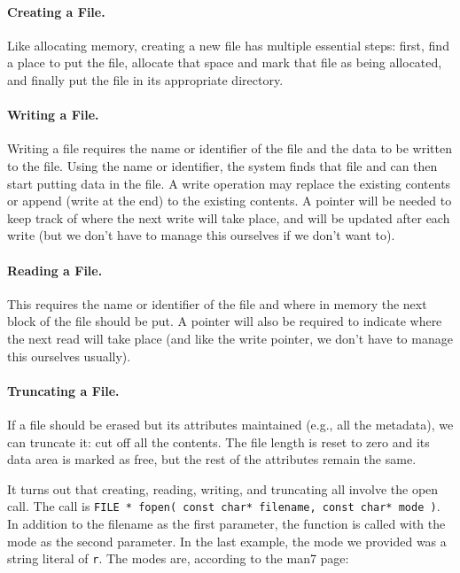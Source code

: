 \paragraph{Creating a File.} Like allocating memory, creating a new file has multiple essential steps: first, find a place to put the file, allocate that space and mark that file as being allocated, and finally put the file in its appropriate directory.

\paragraph{Writing a File.} Writing a file requires the name or identifier of the file and the data to be written to the file. Using the name or identifier, the system finds that file and can then start putting data in the file. A write operation may replace the existing contents or append (write at the end) to the existing contents. A pointer will be needed to keep track of where the next write will take place, and will be updated after each write (but we don't have to manage this ourselves if we don't want to).

\paragraph{Reading a File.} This requires the name or identifier of the file and where in memory the next block of the file should be put. A pointer will also be required to indicate where the next read will take place (and like the write pointer, we don't have to manage this ourselves usually).

\paragraph{Truncating a File.} If a file should be erased but its attributes maintained (e.g., all the metadata), we can truncate it: cut off all the contents. The file length is reset to zero and its data area is marked as free, but the rest of the attributes remain the same.


It turns out that creating, reading, writing, and truncating all involve the open call. The call is \texttt{FILE * fopen( const char* filename, const char* mode )}. In addition to the filename as the first parameter, the function is called with the mode as the second parameter. In the last example, the mode we provided was a string literal of \texttt{r}. The modes are, according to the man7 page:

